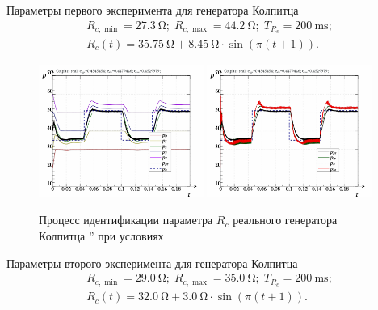 
Параметры первого эксперимента для генератора Колпитца
%
\begin{equation}
  \begin{array}{c}
    R_{c,\min} = \SI{27.3}{\ohm};
    \;
    R_{c,\max} = \SI{44.2}{\ohm};
    \;
    T_{R_c} = \SI{200}{\milli\second};
  \\
    R_c(t) = \SI{35.75}{\ohm} + \SI{8.45}{\ohm} \cdot \sin( \pi ( t + 1 ) ).
  \end{array}
  \label{atu:eq:colp_test1_cond}
\end{equation}

\begin{figure}[htb!]
  \centerline{
    \includegraphics[width=0.48\textwidth]{p/colp_real_id_qi_fv5-p_p_01.png}
    \hfill
    \includegraphics[width=0.48\textwidth]{p/colp_real_id_qi_fv5-p_pp_01.png}
  }
  \caption{Процесс идентификации параметра $R_c$ реального генератора Колпитца '' при условиях }
  \label{atu:f:colp_r_id_1}
\end{figure}


Параметры второго эксперимента для генератора Колпитца
%
\begin{equation}
  \begin{array}{c}
    R_{c,\min} = \SI{29.0}{\ohm};
    \;
    R_{c,\max} = \SI{35.0}{\ohm};
    \;
    T_{R_c} = \SI{200}{\milli\second};
  \\
    R_c(t) = \SI{32.0}{\ohm} + \SI{3.0}{\ohm} \cdot \sin( \pi ( t + 1 ) ).
  \end{array}
  \label{atu:eq:colp_test2_cond}
\end{equation}

